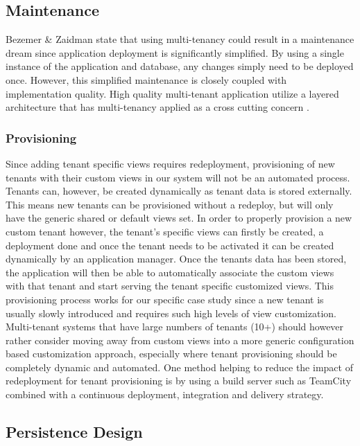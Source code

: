 \subsection{Maintenance}
\label{sec:maintainance}
Bezemer \& Zaidman \cite{Bezemer:2010:MSA:1862372.1862393} state that using multi-tenancy could result in a maintenance dream since application deployment is significantly simplified. By using a single instance of the application and database, any changes simply need to be deployed once. However, this simplified maintenance is closely coupled with implementation quality. High quality multi-tenant application utilize a layered architecture that has multi-tenancy applied as a cross cutting concern \cite{Bezemer:2010:MSA:1862372.1862393}.


\subsubsection{\textbf{Provisioning}}

Since adding tenant specific views requires redeployment, provisioning of new tenants with their custom views in our system will not be an automated process. Tenants can, however, be created dynamically as tenant data is stored externally. This means new tenants can be provisioned without a redeploy, but will only have the generic shared or default views set. In order to properly provision a new custom tenant however, the tenant's specific views can firstly be created, a deployment done and once the tenant needs to be activated it can be created dynamically by an application manager. Once the tenants data has been stored, the application will then be able to automatically associate the custom views with that tenant and start serving the tenant specific customized views. This provisioning process works for our specific case study since a new tenant is usually slowly introduced and requires such high levels of view customization. Multi-tenant systems that have large numbers of tenants (10+) should however rather consider moving away from custom views into a more generic configuration based customization approach, especially where tenant provisioning should be completely dynamic and automated. One method helping to reduce the impact of redeployment for tenant provisioning is by using a build server such as TeamCity combined with a continuous deployment, integration and delivery strategy.


\subsection{Persistence Design}

